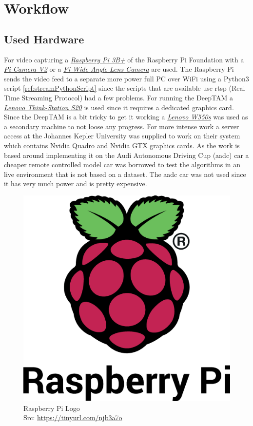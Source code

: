 \chapter{Workflow} \label{ref:workflow}


\section{Used Hardware\authorA}
For video capturing a \href{https://www.raspberrypi.org/products/raspberry-pi-3-model-b-plus/}{\textit{Raspberry Pi 3B+}} of the Raspberry Pi Foundation with a \href{https://www.raspberrypi.org/products/camera-module-v2/}{\textit{Pi Camera V2}} or a \href{https://www.sainsmart.com/products/wide-angle-fov160-5-megapixel-camera-module-for-raspberry-pi}{\textit{Pi Wide Angle Lens Camera}} are used. The Raspberry Pi sends the video feed to a separate more power full PC over WiFi using a Python3 script \ref{ref:streamPythonScript} since the scripts that are available use \gls{rtsp} (Real Time Streaming Protocol) had a few problems. \newline
For running the DeepTAM a \href{https://support.lenovo.com/us/en/solutions/pd005642}{\textit{Lenovo Think-Station S20}} is used since it requires a dedicated graphics card. Since the DeepTAM is a bit tricky to get it working a \href{https://www.lenovo.com/de/de/laptops/thinkpad/w-series/w550s/}{\textit{Lenovo W550s}} was used as a secondary machine to not loose any progress. For more intense work a server access at the Johannes Kepler University was supplied to work on their system which contains Nvidia Quadro and Nvidia GTX graphics cards. \newline
As the work is based around implementing it on the Audi Autonomous Driving Cup (\gls{aadc}) car a cheaper remote controlled model car was borrowed to test the algorithms in an live environment that is not based on a dataset. The \gls{aadc} car was not used since it has very much power and is pretty expensive.\newline
\begin{figure}[h]
	\centering
	\includegraphics[height=0.3\textwidth]{./media/images/rpi_logo.eps}
  	\caption{Raspberry Pi Logo\texttrademark
  	\\Src: \url{https://tinyurl.com/njb3a7o}}
  	\label{picamssetup}
\end{figure}

